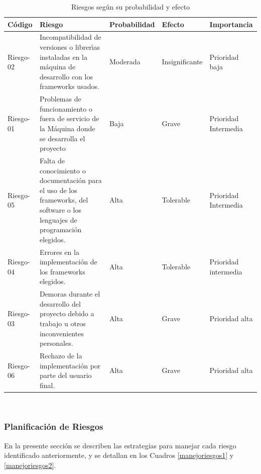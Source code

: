 \begin{table}[h!]
    \begin{tabular}{ | m{1.5cm} | m{4cm}|m{2cm}  | m{2cm}  | m{2cm}  |}
        \hline
        \rowcolor{lightgray}
        Código & Riesgo & Probabilidad & Efecto & Importancia \\
        \hline
        Riesgo-02 & Incompatibilidad de versiones o librerı́as instaladas en la máquina de desarrollo con los frameworks usados. & Moderada &Insignificante&
        \cellcolor[HTML]{84D65C} Prioridad baja \\
        \hline
        Riesgo-01 & Problemas de funcionamiento o fuera de servicio de la Máquina donde se desarrolla el proyecto & Baja &Grave & \cellcolor[HTML]{FFFF00} Prioridad Intermedia\\
        \hline
        Riesgo-05 & Falta de conocimiento o documentación para el uso de los frameworks, del software o los lenguajes de programación elegidos.
         & Alta   & Tolerable& \cellcolor[HTML]{FFFF00} Prioridad Intermedia\\
        \hline
        Riesgo-04  & Errores en la implementación de los frameworks elegidos.  & Alta  &Tolerable &\cellcolor[HTML]{FFFF00} Prioridad intermedia\\
        \hline
         Riesgo-03 & Demoras durante el desarrollo del proyecto debido a trabajo u otros inconvenientes personales.  & Alta  &Grave & \cellcolor[HTML]{FF3333} Prioridad alta\\
        \hline
        Riesgo-06 & Rechazo de la implementación por parte del usuario final.  & Alta  &Grave & \cellcolor[HTML]{FF3333} Prioridad alta\\
        \hline
    \end{tabular}\\
    \caption{Riesgos según su probabilidad y efecto}
    \label{riesgosprobyefecto}
\end{table}

\newpage
\subsubsection{Planificación de Riesgos}

En la presente sección se describen las estrategias para manejar cada riesgo identificado anteriormente, y se detallan en los Cuadros \ref{manejoriesgos1} y \ref{manejoriesgos2}.


